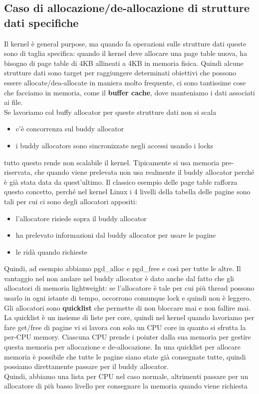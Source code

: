 \documentclass[12pt, oneside]{extbook}
\begin{document}
\subsection{Caso di allocazione/de-allocazione di strutture dati specifiche}
Il kernel è general purpose, ma quando fa operazioni sulle strutture dati queste sono di taglia specifica: quando il kernel deve allocare una page table nuova, ha bisogno di page table di 4KB allineati a 4KB in memoria fisica. Quindi alcune strutture dati sono target per raggiungere determinati obiettivi che possono essere allocate/dea-allocate in maniera molto frequente, ci sono tantissime cose che facciamo in memoria, come il \textbf{buffer cache}, dove manteniamo i dati associati ai file.\\Se lavoriamo col buffy allocator per queste strutture dati non si scala
\begin{itemize}
\item c'è concorrenza sul buddy allocator
\item i buddy allocators sono sincronizzate negli accessi usando i locks
\end{itemize}
tutto questo rende non scalabile il kernel. Tipicamente si usa memoria pre-riservata, che quando viene prelevata non usa realmente il buddy allocator perché è già stata data da quest'ultimo. Il classico esempio delle page table rafforza questo concetto, perché nel kernel Linux i 4 livelli della tabella delle pagine sono tali per cui ci sono degli allocatori appositi:
\begin{itemize}
\item l'allocatore risiede sopra il buddy allocator
\item ha prelevato informazioni dal buddy allocator per usare le pagine
\item le ridà quando richieste
\end{itemize} 
Quindi, ad esempio abbiamo \textsf{pgd\_alloc} e \textsf{pgd\_free} e così per tutte le altre. Il vantaggio nel non andare nel buddy allocator è dato anche dal fatto che gli allocatori di memoria lightweight: se l'allocatore è tale per cui più thread possono usarlo in ogni istante di tempo, occorrono comunque lock e quindi non è leggero. Gli allocatori sono \textbf{quicklist} che permette di non bloccare mai e non fallire mai.\\La quicklist è un insieme di liste per core, quindi nel kernel quando lavoriamo per fare get/free di pagine vi si lavora con solo un CPU core in quanto si sfrutta la per-CPU memory. Ciascuna CPU prende i pointer dalla sua memoria per gestire questa memoria per allocazione e de-allocazione. In una quicklist per allocare memoria è possibile che tutte le pagine siano state già consegnate tutte, quindi possiamo direttamente passare per il buddy allocator.\\Quindi, abbiamo una lista per CPU nel caso normale, altrimenti passare per un allocatore di più basso livello per consegnare la memoria quando viene richiesta
\end{document}

